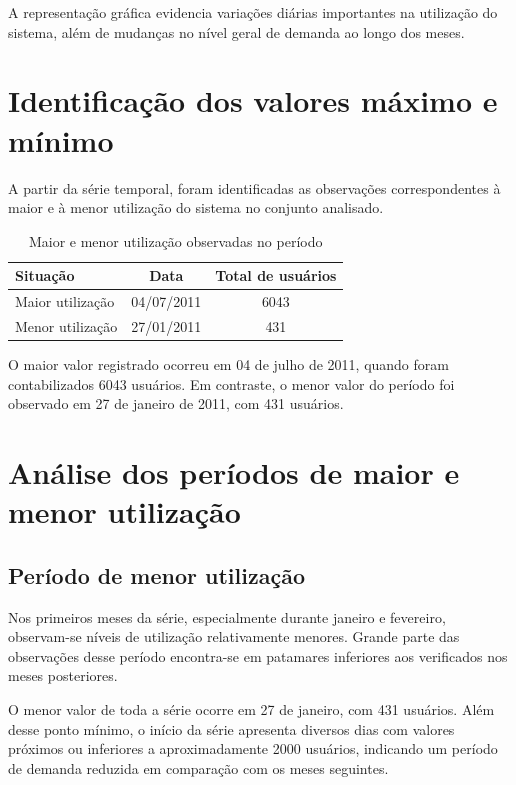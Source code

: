 \documentclass[12pt,a4paper]{article}
\begin{document}
A representação gráfica evidencia variações diárias importantes na utilização
do sistema, além de mudanças no nível geral de demanda ao longo dos meses.

\section{Identificação dos valores máximo e mínimo}

A partir da série temporal, foram identificadas as observações correspondentes à
maior e à menor utilização do sistema no conjunto analisado.

\begin{table}[H]
\centering
\caption{Maior e menor utilização observadas no período}
\begin{tabular}{lcc}
\toprule
\textbf{Situação} & \textbf{Data} & \textbf{Total de usuários} \\
\midrule
Maior utilização & 04/07/2011 & 6043 \\
Menor utilização & 27/01/2011 & 431 \\
\bottomrule
\end{tabular}
\end{table}

O maior valor registrado ocorreu em 04 de julho de 2011, quando foram
contabilizados 6043 usuários. Em contraste, o menor valor do período foi
observado em 27 de janeiro de 2011, com 431 usuários.

\section{Análise dos períodos de maior e menor utilização}

\subsection{Período de menor utilização}

Nos primeiros meses da série, especialmente durante janeiro e fevereiro,
observam-se níveis de utilização relativamente menores. Grande parte das
observações desse período encontra-se em patamares inferiores aos verificados
nos meses posteriores.

O menor valor de toda a série ocorre em 27 de janeiro, com 431 usuários. Além
desse ponto mínimo, o início da série apresenta diversos dias com valores
próximos ou inferiores a aproximadamente 2000 usuários, indicando um período de
demanda reduzida em comparação com os meses seguintes.
\end{document}
